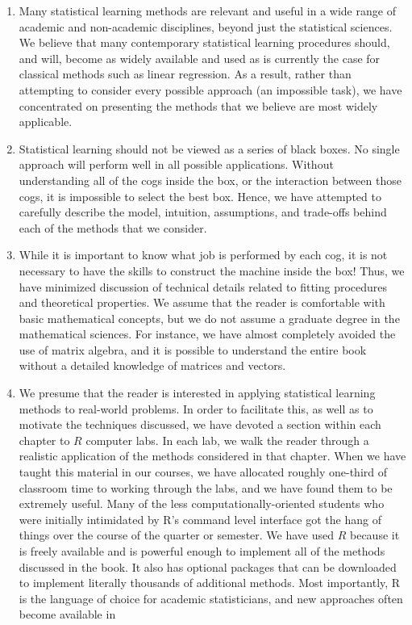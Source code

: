 \documentclass[10pt]{article}
\begin{document}
\begin{enumerate}
  \item Many statistical learning methods are relevant and useful in a wide range of academic and non-academic disciplines, beyond just the statistical sciences. We believe that many contemporary statistical learning procedures should, and will, become as widely available and used as is currently the case for classical methods such as linear regression. As a result, rather than attempting to consider every possible approach (an impossible task), we have concentrated on presenting the methods that we believe are most widely applicable.
  \item Statistical learning should not be viewed as a series of black boxes. No single approach will perform well in all possible applications. Without understanding all of the cogs inside the box, or the interaction between those cogs, it is impossible to select the best box. Hence, we have attempted to carefully describe the model, intuition, assumptions, and trade-offs behind each of the methods that we consider.
  \item While it is important to know what job is performed by each cog, it is not necessary to have the skills to construct the machine inside the box! Thus, we have minimized discussion of technical details related to fitting procedures and theoretical properties. We assume that the reader is comfortable with basic mathematical concepts, but we do not assume a graduate degree in the mathematical sciences. For instance, we have almost completely avoided the use of matrix algebra, and it is possible to understand the entire book without a detailed knowledge of matrices and vectors.
  \item We presume that the reader is interested in applying statistical learning methods to real-world problems. In order to facilitate this, as well as to motivate the techniques discussed, we have devoted a section within each chapter to $R$ computer labs. In each lab, we walk the reader through a realistic application of the methods considered in that chapter. When we have taught this material in our courses, we have allocated roughly one-third of classroom time to working through the labs, and we have found them to be extremely useful. Many of the less computationally-oriented students who were initially intimidated by R's command level interface got the hang of things over the course of the quarter or semester. We have used $R$ because it is freely available and is powerful enough to implement all of the methods discussed in the book. It also has optional packages that can be downloaded to implement literally thousands of additional methods. Most importantly, R is the language of choice for academic statisticians, and new approaches often become available in
\end{enumerate}
\end{document}
